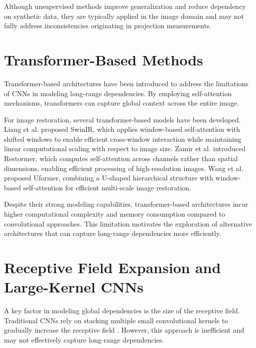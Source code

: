 Although unsupervised methods improve generalization and reduce dependency on synthetic data, they are typically applied in the image domain and may not fully address inconsistencies originating in projection measurements.



 


\section{Transformer-Based Methods} 

Transformer-based architectures have been introduced to address the limitations of CNNs in modeling long-range dependencies. By employing self-attention mechanisms, transformers can capture global context across the entire image.

For image restoration, several transformer-based models have been developed. Liang et al. \cite{liang2021swinir} proposed SwinIR, which applies window-based self-attention with shifted windows to enable efficient cross-window interaction while maintaining linear computational scaling with respect to image size. Zamir et al. \cite{restormer2022} introduced Restormer, which computes self-attention across channels rather than spatial dimensions, enabling efficient processing of high-resolution images. Wang et al. \cite{Wan+22} proposed Uformer, combining a U-shaped hierarchical structure with window-based self-attention for efficient multi-scale image restoration. 

Despite their strong modeling capabilities, transformer-based architectures incur higher computational complexity and memory consumption compared to convolutional approaches. This limitation motivates the exploration of alternative architectures that can capture long-range dependencies more efficiently.



\section{Receptive Field Expansion and Large-Kernel CNNs}

A key factor in modeling global dependencies is the size of the receptive field. Traditional CNNs rely on stacking multiple small convolutional kernels to gradually increase the receptive field \cite{Luo2016}. However, this approach is inefficient and may not effectively capture long-range dependencies.

